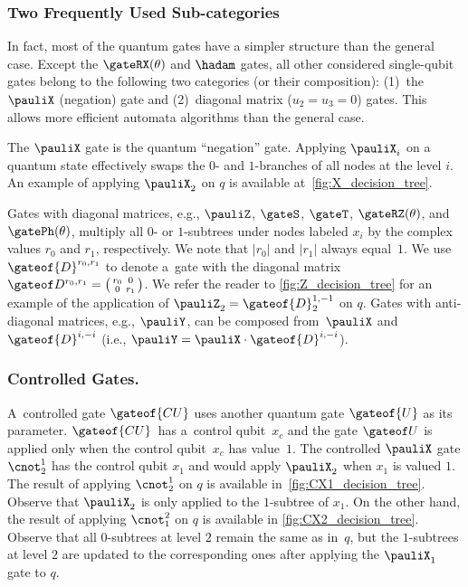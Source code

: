 \figDecisiontreesinglegate

\vspace{-0.0mm}
\subsubsection{Two Frequently Used Sub-categories}\label{sec:label}
\vspace{-0.0mm}

In fact, most of the quantum
gates have a simpler structure than the general case. Except the
$\gateRX(\theta)$ and $\hadam$ gates, all other considered single-qubit gates belong to the following
two categories (or their composition): (1)~the $\pauliX$ (negation) gate and
(2)~diagonal matrix ($u_2=u_3=0$) gates.
This allows more efficient automata algorithms than the general case.

The $\pauliX$ gate is the quantum ``negation'' gate. Applying $\pauliX_i$ on a
quantum state effectively swaps the $0$- and $1$-branches of all nodes at the
level $i$. An example of applying $\pauliX_2$ on $q$ is available at~\cref{fig:X_decision_tree}.

Gates with diagonal matrices, e.g., $\pauliZ$, $\gateS$, $\gateT$, $\gateRZ(\theta)$, and $\gatePh(\theta)$, multiply
all $0$- or $1$-subtrees under nodes labeled $x_i$ by the complex values
$r_0$ and $r_1$,
respectively. We note that $|r_0|$ and
$|r_1|$ always equal~$1$. We use $\gateof{D}^{r_0,r_1}$ to denote a~gate with
the diagonal matrix 
$\gateof D^{r_0,r_1} =
\big(
\begin{smallmatrix}
r_0 & 0\\
0 & r_1
\end{smallmatrix}\big)$.
We refer the reader to \cref{fig:Z_decision_tree} for an example of the
application of $\pauliZ_2=\gateof{D}_2^{1,-1}$ on $q$. 
Gates with anti-diagonal matrices, e.g., $\pauliY$, can be composed from~$\pauliX$ and $\gateof{D}^{i,-i}$ (i.e., $\pauliY = \pauliX\cdot \gateof{D}^{i,-i}$).



\subsubsection{Controlled Gates.}

A~controlled gate $\gateof{CU}$ uses another quantum gate $\gateof{U}$ as its
parameter. $\gateof{CU}$~has
a~control qubit~$x_c$ and the gate $\gateof U$ is applied only when the control
qubit~$x_c$ has value~$1$.
The controlled $\pauliX$ gate $\cnot^1_2$ has the control qubit
$x_1$ and would apply $\pauliX_2$ when $x_1$ is valued $1$.\figDecisiontreecontrolled   %
The result of applying $\cnot^1_2$ on $q$ is available in~\cref{fig:CX1_decision_tree}.
Observe that $\pauliX_2$ is only applied to the $1$-subtree of $x_1$. 
On the other hand, the result of applying $\cnot^2_1$ on $q$ is available in
\cref{fig:CX2_decision_tree}. Observe that all $0$-subtrees at level $2$ remain
the same as in~$q$, but the $1$-subtrees at level $2$ are updated to the
corresponding ones after applying the $\pauliX_1$ gate to $q$.


